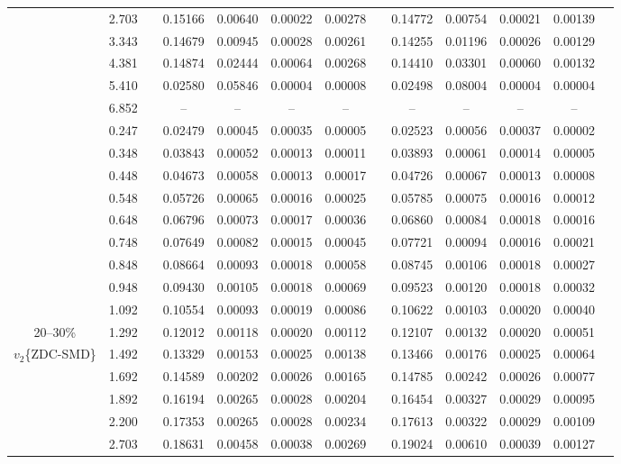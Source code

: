 \documentclass[aps,prc,superscriptaddress,showpacs,floatfix,twocolumn]{revtex4}
\begin{document}
\begin{table}[htbp]
\begin{ruledtabular}
\begin{tabular}{c|cccccccccccc}
 & 2.703 && 0.15166 & 0.00640 & 0.00022 & 0.00278 & & 0.14772 & 0.00754 & 0.00021 & 0.00139 \\ 
 & 3.343 && 0.14679 & 0.00945 & 0.00028 & 0.00261 & & 0.14255 & 0.01196 & 0.00026 & 0.00129 \\ 
 & 4.381 && 0.14874 & 0.02444 & 0.00064 & 0.00268 & & 0.14410 & 0.03301 & 0.00060 & 0.00132 \\ 
 & 5.410 && 0.02580 & 0.05846 & 0.00004 & 0.00008 & & 0.02498 & 0.08004 & 0.00004 & 0.00004 \\ 
 & 6.852 && -- & -- & -- & -- & & -- & -- & -- & -- \\ 
\hline 
 & 0.247 && 0.02479 & 0.00045 & 0.00035 & 0.00005 & & 0.02523 & 0.00056 & 0.00037 & 0.00002 \\ 
 & 0.348 && 0.03843 & 0.00052 & 0.00013 & 0.00011 & & 0.03893 & 0.00061 & 0.00014 & 0.00005 \\ 
 & 0.448 && 0.04673 & 0.00058 & 0.00013 & 0.00017 & & 0.04726 & 0.00067 & 0.00013 & 0.00008 \\ 
 & 0.548 && 0.05726 & 0.00065 & 0.00016 & 0.00025 & & 0.05785 & 0.00075 & 0.00016 & 0.00012 \\ 
 & 0.648 && 0.06796 & 0.00073 & 0.00017 & 0.00036 & & 0.06860 & 0.00084 & 0.00018 & 0.00016 \\ 
 & 0.748 && 0.07649 & 0.00082 & 0.00015 & 0.00045 & & 0.07721 & 0.00094 & 0.00016 & 0.00021 \\ 
 & 0.848 && 0.08664 & 0.00093 & 0.00018 & 0.00058 & & 0.08745 & 0.00106 & 0.00018 & 0.00027 \\ 
 & 0.948 && 0.09430 & 0.00105 & 0.00018 & 0.00069 & & 0.09523 & 0.00120 & 0.00018 & 0.00032 \\ 
 & 1.092 && 0.10554 & 0.00093 & 0.00019 & 0.00086 & & 0.10622 & 0.00103 & 0.00020 & 0.00040 \\ 
20--30\%
 & 1.292 && 0.12012 & 0.00118 & 0.00020 & 0.00112 & & 0.12107 & 0.00132 & 0.00020 & 0.00051 \\ 
$v_2$\{ZDC-SMD\}
 & 1.492 && 0.13329 & 0.00153 & 0.00025 & 0.00138 & & 0.13466 & 0.00176 & 0.00025 & 0.00064 \\ 
 & 1.692 && 0.14589 & 0.00202 & 0.00026 & 0.00165 & & 0.14785 & 0.00242 & 0.00026 & 0.00077 \\ 
 & 1.892 && 0.16194 & 0.00265 & 0.00028 & 0.00204 & & 0.16454 & 0.00327 & 0.00029 & 0.00095 \\ 
 & 2.200 && 0.17353 & 0.00265 & 0.00028 & 0.00234 & & 0.17613 & 0.00322 & 0.00029 & 0.00109 \\ 
 & 2.703 && 0.18631 & 0.00458 & 0.00038 & 0.00269 & & 0.19024 & 0.00610 & 0.00039 & 0.00127 \\ 

\end{tabular}
\end{ruledtabular}
\end{table}
\end{document}
